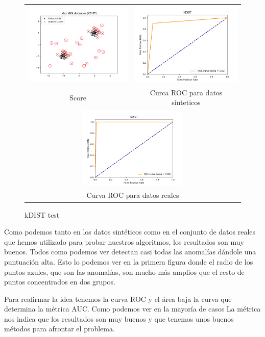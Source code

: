 \begin{figure}[H]
  \begin{tabular}{cc}
    \includegraphics[width=65mm,height=40mm]{imagenes/kdist-sintetico.png} &   \includegraphics[width=65mm,height=40mm]{imagenes/kdist-sintetic-roc.png} \\
  Score & Curca ROC para datos sinteticos \\[6pt]
  \multicolumn{2}{c}{\includegraphics[width=65mm,height=39mm]{imagenes/kdist-test.png} }\\
  \multicolumn{2}{c}{Curva ROC para datos reales}\\
  \end{tabular}
  \caption{\label{fig:kdisttest} kDIST test}
\end{figure}

Como podemos tanto en los datos sintéticos como en el conjunto de datos reales
que hemos utilizado para probar nuestros algoritmos, los resultados son
muy buenos. Todos como podemos ver detectan casi todas las anomalías 
dándole una puntuación alta. Esto lo podemos ver en la primera figura 
donde el radio de los puntos azules, que son las anomalías, son mucho más
amplios que el resto de puntos concentrados en dos grupos.

Para reafirmar la idea tenemos la curva ROC y el área baja la curva que
determina la métrica AUC. Como podemos ver en la mayoría de casos La métrica nos 
indica que los resultados son muy buenos y que tenemos unos buenos métodos para afrontar
el problema.

